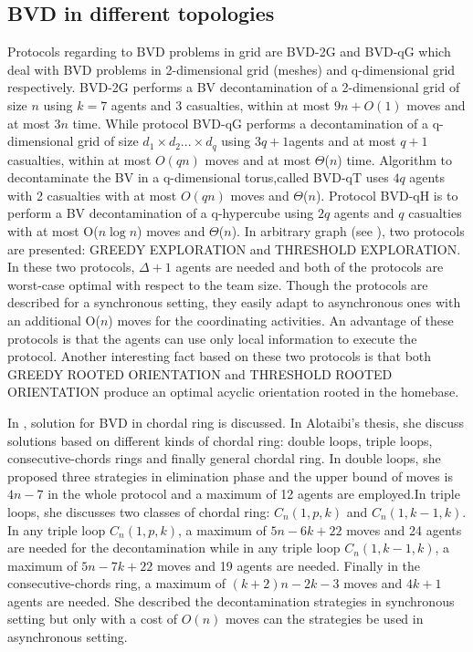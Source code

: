 \subsection{BVD in different topologies}
Protocols regarding to BVD problems in grid are BVD-2G and BVD-qG which deal with BVD problems in 2-dimensional grid (meshes) and q-dimensional grid respectively. BVD-2G performs a BV decontamination of a 2-dimensional grid of size $n$ using $k=7$ agents and 3 casualties, within at most $9n+O(1)$ moves and at most $3n$ time. While protocol BVD-qG performs a decontamination of a q-dimensional grid of size $d_1\times d_2 ...\times d_q$ using $3q+1$agents and at most $q+1$ casualties, within at most $O(qn)$ moves and at most $\Theta$($n$) time. Algorithm to decontaminate the BV in a q-dimensional torus,called BVD-qT uses $4q$ agents with 2 casualties with at most $O(qn)$ moves and $\Theta$($n$). Protocol BVD-qH is to perform a BV decontamination of a q-hypercube using $2q$ agents and $q$ casualties with at most O($n\log n$) moves and $\Theta$($n$). In arbitrary graph (see \cite{Cai1}), two protocols are presented: GREEDY EXPLORATION and THRESHOLD EXPLORATION. In these two protocols, $\Delta +1$ agents are needed and both of the protocols are worst-case optimal with respect to the team size. Though the protocols are described for a synchronous setting, they easily adapt to asynchronous ones with an additional O($n$) moves for the coordinating activities. An advantage of these protocols is that the agents can use only local information to execute the protocol. Another interesting fact based on these two protocols is that both GREEDY ROOTED ORIENTATION and THRESHOLD ROOTED ORIENTATION produce an optimal acyclic orientation rooted in the homebase.

In \cite{Alotaibi}, solution for BVD in chordal ring is discussed. In Alotaibi's thesis, she discuss solutions based on different kinds of chordal ring: double loops, triple loops, consecutive-chords rings and finally general chordal ring. In double loops, she proposed three strategies in elimination phase and the upper bound of moves is $4n-7$ in the whole protocol and a maximum of 12 agents are employed.In triple loops, she discusses two classes of chordal ring: $C_n(1,p,k)$ and $C_n(1,k-1,k)$. In any triple loop $C_n(1,p,k)$, a maximum of $5n-6k+22$ moves and 24 agents are needed for the decontamination while in any triple loop $C_n(1,k-1,k)$, a maximum of $5n-7k+22$ moves and 19 agents are needed. Finally in the consecutive-chords ring, a maximum of $(k+2)n-2k-3$ moves and $4k+1$ agents are needed. She described the decontamination strategies in synchronous setting but only with a cost of $O(n)$ moves can the strategies be used in asynchronous setting.

